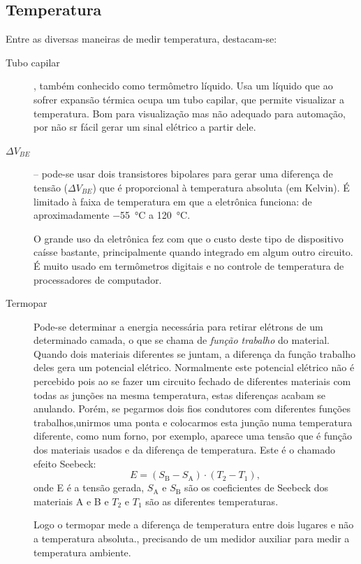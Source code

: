 \subsection{Temperatura}
Entre as diversas maneiras de medir temperatura, destacam-se:
\begin{description}
  \item[Tubo capilar], também conhecido como termômetro líquido. Usa um líquido que ao sofrer expansão térmica ocupa um tubo capilar, que permite visualizar a temperatura. Bom para visualização mas não adequado para automação, por não sr fácil gerar um sinal elétrico a partir dele.

  \item[$\Delta V_{BE}$] -- pode-se usar dois transistores bipolares para gerar uma diferença de tensão ($\Delta V_{BE}$) que é proporcional à temperatura absoluta (em Kelvin). É limitado à faixa de temperatura em que a eletrônica funciona: de aproximadamente \SI{-55}{\celsius} a \SI{120}{\celsius}.

  O grande uso da eletrônica fez com que o custo deste tipo de dispositivo caísse bastante, principalmente quando integrado em algum outro circuito. É muito usado em termômetros digitais e no controle de temperatura de processadores de computador.

  \item[Termopar] Pode-se determinar a energia necessária para retirar elétrons de um determinado camada, o que se chama de \emph{função trabalho} do material. Quando dois materiais diferentes se juntam, a diferença da função trabalho deles gera um potencial elétrico. Normalmente este potencial elétrico não é percebido pois ao se fazer um circuito fechado de diferentes materiais com todas as junções na mesma temperatura, estas diferenças acabam se anulando. Porém, se pegarmos dois fios condutores com diferentes funções trabalhos,unirmos uma ponta e colocarmos esta junção numa temperatura diferente, como num forno, por exemplo, aparece uma tensão que é função dos materiais usados e da diferença de temperatura. Este é o chamado efeito Seebeck:
  \[
E = (S_\mathrm{B} - S_\mathrm{A}) \cdot (T_2 - T_1),
  \]
  onde E é a tensão gerada, $S_\mathrm{A}$ e $S_\mathrm{B}$ são os coeficientes de Seebeck dos materiais A e B e $T_2$ e $T_1$ são as diferentes temperaturas.

Logo o termopar mede a diferença de temperatura entre dois lugares e não a temperatura absoluta., precisando de um medidor auxiliar para medir a temperatura ambiente.


\end{description}
